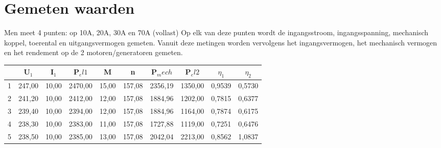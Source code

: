 \section{Gemeten waarden}

Men meet 4 punten: op 10A, 20A, 30A en 70A (vollast)
Op elk van deze punten wordt de ingangsstroom, ingangsspanning, mechanisch koppel,
toerental en uitgangsvermogen gemeten.
Vanuit deze metingen worden vervolgens het ingangsvermogen, het mechanisch vermogen
en het rendement op de 2 motoren/generatoren gemeten.

\begin{tabular}{| c | c | c | c | c | c | c | c | c | c |}
    \hline
      & U$_1$  & I$_1$ & P$_el1$ & M     & n      & P$_mech$& P$_el2$ &$\eta_1$&$\eta_2$\\ \hline
    1 & 247,00 & 10,00 & 2470,00 & 15,00 & 157,08 & 2356,19 & 1350,00 & 0,9539 & 0,5730 \\ \hline
    2 & 241,20 & 10,00 & 2412,00 & 12,00 & 157,08 & 1884,96 & 1202,00 & 0,7815 & 0,6377 \\ \hline
    3 & 239,40 & 10,00 & 2394,00 & 12,00 & 157,08 & 1884,96 & 1164,00 & 0,7874 & 0,6175 \\ \hline
    4 & 238,30 & 10,00 & 2383,00 & 11,00 & 157,08 & 1727,88 & 1119,00 & 0,7251 & 0,6476 \\ \hline
    5 & 238,50 & 10,00 & 2385,00 & 13,00 & 157,08 & 2042,04 & 2213,00 & 0,8562 & 1,0837 \\ \hline
\end{tabular}